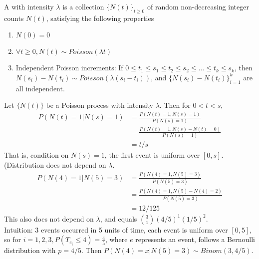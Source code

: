 \documentclass[11pt]{article}
\begin{document}
   	A  with intensity $\lambda$ is a collection $\{N(t)\}_{t\geq 0}$ of random non-decreasing integer counts $N(t)$, satisfying the following properties
   	\begin{enumerate}
   		\item $N(0) = 0$
   		\item $\forall t \geq 0, N(t) \sim Poisson(\lambda t)$
   		\item Independent Poisson increments: If $0 \leq t_1 \leq s_1 \leq t_2 \leq s_2 \leq \hdots \leq t_k \leq s_k$, then $N(s_i) - N(t_i) \sim Poisson(\lambda(s_i - t_i))$, and $\{N(s_i) - N(t_i)\}_{i=1}^k$ are all independent.
   	\end{enumerate}
   	\example
   	Let $\{N(t)\}$ be a Poisson process with intensity $\lambda$. Then for $0 < t <s$,
   	\begin{align*}
   		P(N(t) = 1| N(s) = 1) &= \frac{P(N(t) = 1, N(s) = 1)}{P(N(s) = 1)}\\
   		&= \frac{P(N(t) = 1, N(s) - N(t) = 0)}{P(N(s) = 1)} \\
   		&= t/s
   	\end{align*}
   	That is, condition on $N(s) = 1$, the first event is uniform over $[0, s]$. (Distribution does not depend on $\lambda$.
   	\example
   	\begin{align*}
   		P(N(4) = 1| N(5) = 3) &= \frac{P(N(4) = 1, N(5) = 3)}{P(N(5) = 3)} \\
   		&= \frac{P(N(4) = 1, N(5) - N(4) = 2)}{P(N(5) = 3)} \\
   		&= 12/125
   	\end{align*}
   	This also does not depend on $\lambda$, and equals ${3 \choose 1}(4/5)^1 (1/5)^2$.\\
   	Intuition: 3 events occurred in 5 units of time, each event is uniform over $[0,5]$, so for $i = 1, 2, 3, P(T_{e_i} \leq 4) = \frac{4}{5}$, where $e$ represents an event, follows a Bernoulli distribution with $p = 4/5$. Then $P(N(4) = x|N(5) = 3) \sim Binom(3, 4/5)$.  
    
    
    
    
    
    
    
    
    
    
    
    
    
    
    
    
    
    
    
    
\end{document}

